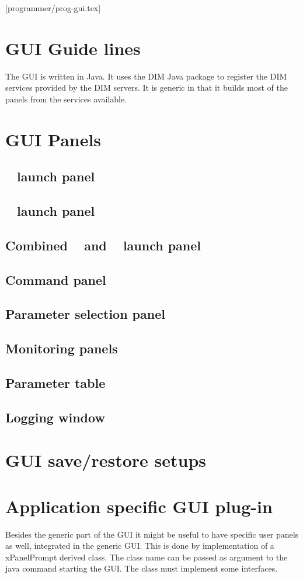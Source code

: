 [programmer/prog-gui.tex]
\section{GUI Guide lines}
The \dabc GUI is written in Java. It uses the DIM Java package to register the
DIM services provided by the \dabc DIM servers. It is generic in that it
builds most of the panels from the services available.

\section{GUI Panels}
\subsection{\dabc~ launch panel}
\subsection{\mbs~ launch panel}
\subsection{Combined \dabc~ and \mbs~ launch panel}
\subsection{Command panel}
\subsection{Parameter selection panel}
\subsection{Monitoring panels}
\subsection{Parameter table}
\subsection{Logging window}
\section{GUI save/restore setups}
\section{Application specific GUI plug-in}
Besides the generic part of the GUI it might be useful to have specific user panels as well, integrated in the generic GUI. This is done by implementation of a xPanelPrompt derived class. The class name can be 
passed as argument to the java command starting the GUI. The class must implement some interfaces.

